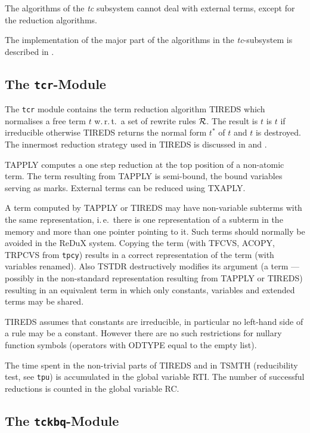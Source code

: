 The algorithms of the {\it tc} subsystem cannot deal with external terms,
except for the reduction algorithms.

The implementation of the major part of the  algorithms in the
{\it tc}-subsystem is described in \cite{Kuechlin:82a}.

\subsection{The {\tt tcr}-Module}

The {\tt tcr} module contains the term reduction algorithm TIREDS which 
normalises a free term $t$ w.\,r.\,t.\ a set of rewrite rules $\cal R$.
The result is $t$ is $t$ if irreducible otherwise TIREDS returns the normal
form $t^*$ of $t$ and $t$ is destroyed.
The innermost reduction strategy used in TIREDS is discussed in
\cite{Kuechlin:82b} and \cite{Stickel:83}.

TAPPLY computes a one step reduction at the top position of a non-atomic term.
The term resulting from TAPPLY is semi-bound, the bound variables serving
as marks.
External terms can be reduced using TXAPLY.

A term computed by TAPPLY or TIREDS may have non-variable subterms with the
same representation, i.\,e.\ there is one representation of a subterm
in the memory and more than one pointer pointing to it.
Such terms should normally be avoided in the ReDuX system.
Copying the term (with TFCVS, ACOPY, TRPCVS from {\tt tpcy}) results in a 
correct representation of the term (with variables renamed).
Also TSTDR destructively modifies its argument (a term --- possibly in the 
non-standard representation resulting from TAPPLY or TIREDS) resulting in an
equivalent term in which only constants, variables and extended terms may
be shared.

TIREDS assumes that constants are irreducible, in particular no left-hand side
of a rule may be a constant.
However there are no such restrictions for nullary function symbols
(operators with ODTYPE equal to the empty list).

The time spent in the non-trivial parts of TIREDS and in TSMTH 
(reducibility test, see {\tt tpu}) is accumulated in the global variable RTI.
The number of successful reductions is counted in the global variable RC.

\subsection{The {\tt tckbq}-Module}


